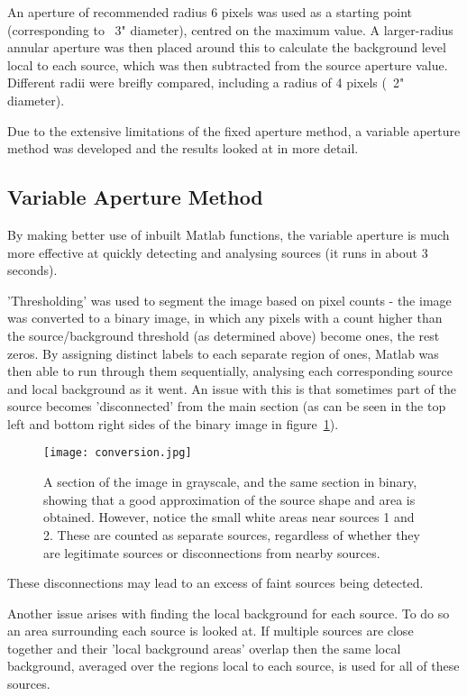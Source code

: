 \documentclass[a4paper,11pt,twoside]{article}
\begin{document}
An aperture of recommended radius 6 pixels\cite{clem} was used as 
a starting point (corresponding to ~3" diameter), centred on the maximum 
value. A larger-radius annular aperture was then placed around 
this to calculate the background level local to each source, which 
was then subtracted from the source aperture value. 
Different radii were breifly compared, including a radius of 4 pixels 
(~2" diameter).

Due to the extensive limitations of the fixed aperture method, a variable 
aperture method was developed and the results looked at in more detail.

\subsection{Variable Aperture Method}

By making better use of inbuilt Matlab functions, the variable aperture is 
much more effective at quickly detecting and analysing sources (it runs in 
about 3 seconds). 

'Thresholding' was used to segment the image based on pixel counts - the 
image was converted to a binary image, in which any pixels with a count 
higher than the source/background threshold (as determined above) become 
ones, the rest zeros. By assigning distinct labels to each separate 
region of ones, Matlab was then able to run through them sequentially, 
analysing each corresponding source and local background as it went.
An issue with this is that sometimes part of the source becomes 'disconnected' 
from the main section (as can be seen in the top left and bottom 
right sides of the binary image in figure~\ref{fig:conversion}).

\begin{figure}[htb]
  \centering
  \texttt{[image: conversion.jpg]}
  \caption{A section of the image in grayscale, and the same section 
in binary, showing that a good approximation of the source shape and 
area is obtained. However, notice the small white areas near sources 
1 and 2. These are counted as separate sources, regardless of whether 
they are legitimate sources or disconnections from nearby sources.}
  \label{fig:conversion}
\end{figure}

These disconnections may lead to an excess of faint sources being detected.

Another issue arises with finding the local background for each source. 
To do so an area surrounding each source is looked at. If multiple sources 
are close together and their 'local background areas' overlap then the 
same local background, averaged over the regions local to each source, 
is used for all of these sources.
\end{document}
